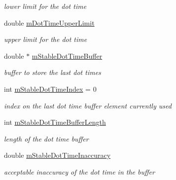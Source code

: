 \begin{DoxyCompactItemize}
\begin{DoxyCompactList}\small\item\em lower limit for the dot time \end{DoxyCompactList}\item 
\mbox{\label{classMorseDecode_a6e75a198f717b8c4d5058f689949e11b}} 
double \hyperlink{classMorseDecode_a6e75a198f717b8c4d5058f689949e11b}{m\+Dot\+Time\+Upper\+Limit}
\begin{DoxyCompactList}\small\item\em upper limit for the dot time \end{DoxyCompactList}\item 
\mbox{\label{classMorseDecode_a517da3fc71446807aa87aff1f70d9b33}} 
double $\ast$ \hyperlink{classMorseDecode_a517da3fc71446807aa87aff1f70d9b33}{m\+Stable\+Dot\+Time\+Buffer}
\begin{DoxyCompactList}\small\item\em buffer to store the last dot times \end{DoxyCompactList}\item 
\mbox{\label{classMorseDecode_ae7e8e125969f999ec26811b1d290ae3d}} 
int \hyperlink{classMorseDecode_ae7e8e125969f999ec26811b1d290ae3d}{m\+Stable\+Dot\+Time\+Index} = 0
\begin{DoxyCompactList}\small\item\em index on the last dot time buffer element currently used \end{DoxyCompactList}\item 
\mbox{\label{classMorseDecode_ace521f9f63a14a08e28966c0a0e39f9a}} 
int \hyperlink{classMorseDecode_ace521f9f63a14a08e28966c0a0e39f9a}{m\+Stable\+Dot\+Time\+Buffer\+Length}
\begin{DoxyCompactList}\small\item\em length of the dot time buffer \end{DoxyCompactList}\item 
\mbox{\label{classMorseDecode_a4e9fdde2de552eed295f13a5dda55a3e}} 
double \hyperlink{classMorseDecode_a4e9fdde2de552eed295f13a5dda55a3e}{m\+Stable\+Dot\+Time\+Inaccuracy}
\begin{DoxyCompactList}\small\item\em acceptable inaccuracy of the dot time in the buffer \end{DoxyCompactList}\item 

\end{DoxyCompactItemize}

